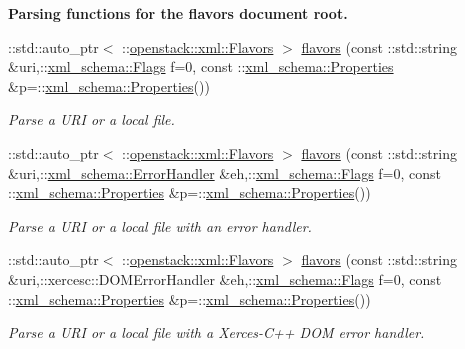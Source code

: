 \begin{Indent}{\bf Parsing functions for the flavors document root.}\par
\begin{DoxyCompactItemize}
\item 
::std::auto\_\-ptr$<$ ::\hyperlink{classopenstack_1_1xml_1_1Flavors}{openstack::xml::Flavors} $>$ \hyperlink{namespaceopenstack_1_1xml_abe824750e83d077b237826c8f80d816e}{flavors} (const ::std::string \&uri,::\hyperlink{namespacexml__schema_affb4c227cbd9aa7453dd1dc5a1401943}{xml\_\-schema::Flags} f=0, const ::\hyperlink{namespacexml__schema_ad27ce19a7ee1d3b1064092648898f64c}{xml\_\-schema::Properties} \&p=::\hyperlink{namespacexml__schema_ad27ce19a7ee1d3b1064092648898f64c}{xml\_\-schema::Properties}())
\begin{DoxyCompactList}\small\item\em Parse a URI or a local file. \item\end{DoxyCompactList}\item 
::std::auto\_\-ptr$<$ ::\hyperlink{classopenstack_1_1xml_1_1Flavors}{openstack::xml::Flavors} $>$ \hyperlink{namespaceopenstack_1_1xml_a6455aeed36097b093fd860871475c134}{flavors} (const ::std::string \&uri,::\hyperlink{namespacexml__schema_ab1c9361bfd3b404eaabf0c31eded79dc}{xml\_\-schema::ErrorHandler} \&eh,::\hyperlink{namespacexml__schema_affb4c227cbd9aa7453dd1dc5a1401943}{xml\_\-schema::Flags} f=0, const ::\hyperlink{namespacexml__schema_ad27ce19a7ee1d3b1064092648898f64c}{xml\_\-schema::Properties} \&p=::\hyperlink{namespacexml__schema_ad27ce19a7ee1d3b1064092648898f64c}{xml\_\-schema::Properties}())
\begin{DoxyCompactList}\small\item\em Parse a URI or a local file with an error handler. \item\end{DoxyCompactList}\item 
::std::auto\_\-ptr$<$ ::\hyperlink{classopenstack_1_1xml_1_1Flavors}{openstack::xml::Flavors} $>$ \hyperlink{namespaceopenstack_1_1xml_a0dc063979df45b1fb68b9e5e3d02c5cf}{flavors} (const ::std::string \&uri,::xercesc::DOMErrorHandler \&eh,::\hyperlink{namespacexml__schema_affb4c227cbd9aa7453dd1dc5a1401943}{xml\_\-schema::Flags} f=0, const ::\hyperlink{namespacexml__schema_ad27ce19a7ee1d3b1064092648898f64c}{xml\_\-schema::Properties} \&p=::\hyperlink{namespacexml__schema_ad27ce19a7ee1d3b1064092648898f64c}{xml\_\-schema::Properties}())
\begin{DoxyCompactList}\small\item\em Parse a URI or a local file with a Xerces-\/C++ DOM error handler. \item\end{DoxyCompactList}\item 

\end{DoxyCompactItemize}
\end{Indent}
